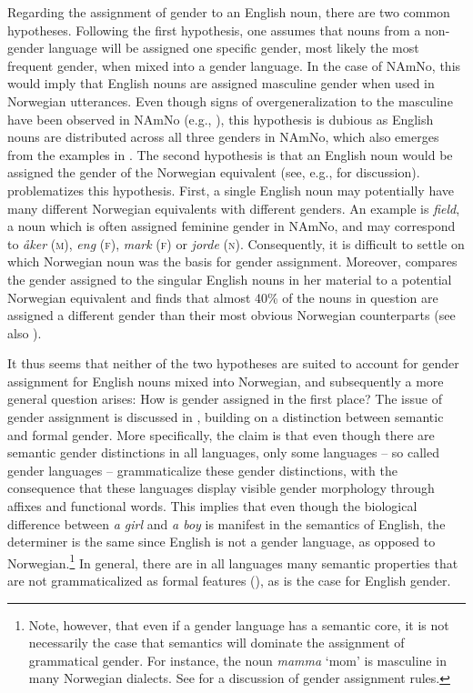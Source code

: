 \documentclass[output=paper]{langscibook}
\begin{document}
Regarding the assignment of gender to an English noun, there are two common hypotheses. Following the first hypothesis, one assumes that nouns from a non-gender language will be assigned one specific gender, most likely the most frequent gender, when mixed into a gender language. In the case of NAmNo, this would imply that English nouns are assigned masculine gender when used in Norwegian utterances. Even though signs of overgeneralization to the masculine have been observed in NAmNo (e.g., \citealt{LohndalWestergaard2016}), this hypothesis is dubious as English nouns are distributed across all three genders in NAmNo, which also emerges from the examples in . The second hypothesis is that an English noun would be assigned the gender of the Norwegian equivalent (see, e.g., \citealt{JakeEtAl2002, LicerasEtAl2008, ParafitaCouto2015} for discussion). \textcite[93–95]{Riksem2018Thesis} problematizes this hypothesis. First, a single English noun may potentially have many different Norwegian equivalents with different genders. An example is \textit{field}, a noun which is often assigned feminine gender in NAmNo, and may correspond to \textit{åker} (\textsc{m}), \textit{eng} (\textsc{f}), \textit{mark} (\textsc{f}) or \textit{jorde} (\textsc{n}). Consequently, it is difficult to settle on which Norwegian noun was the basis for gender assignment. Moreover, \citet[94]{Riksem2018Thesis} compares the gender assigned to the singular English nouns in her material to a potential Norwegian equivalent and finds that almost 40\% of the nouns in question are assigned a different gender than their most obvious Norwegian counterparts (see also \citealt{Tjugum2016}).



It thus seems that neither of the two hypotheses are suited to account for gender assignment for English nouns mixed into Norwegian, and subsequently a more general question arises: How is gender assigned in the first place? The issue of gender assignment is discussed in \citet{ÅfarliEtAl2021}, building on a distinction between semantic and formal gender. More specifically, the claim is that even though there are semantic gender distinctions in all languages, only some languages – so called gender languages – grammaticalize these gender distinctions, with the consequence that these languages display visible gender morphology through affixes and functional words. This implies that even though the biological difference between \textit{a girl} and \textit{a boy} is manifest in the semantics of English, the determiner is the same since English is not a gender language, as opposed to Norwegian.\footnote{ \textrm{Note, however, that even if a gender language has a semantic core, it is not necessarily the case that semantics will dominate the assignment of grammatical gender. For instance, the noun} \textrm{\textit{mamma} }\textrm{‘mom’ is masculine in many Norwegian dialects. See \citet{Enger2009} for a discussion of gender assignment rules.} } In general, there are in all languages many semantic properties that are not grammaticalized as formal features (\citealt{NarrogHeine2011}), as is the case for English gender.
\end{document}
